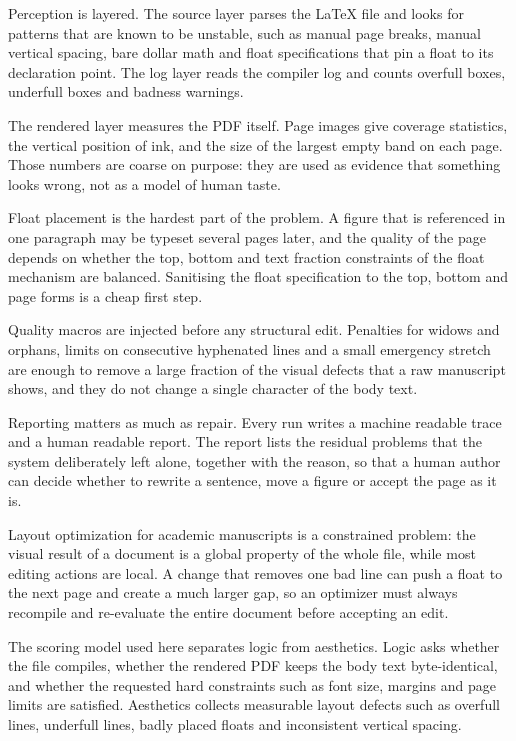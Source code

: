 \documentclass[10pt,a4paper]{article}
\begin{document}
Perception is layered. The source layer parses the LaTeX file and looks for patterns that are known to be unstable, such as manual page breaks, manual vertical spacing, bare dollar math and float specifications that pin a float to its declaration point. The log layer reads the compiler log and counts overfull boxes, underfull boxes and badness warnings.

The rendered layer measures the PDF itself. Page images give coverage statistics, the vertical position of ink, and the size of the largest empty band on each page. Those numbers are coarse on purpose: they are used as evidence that something looks wrong, not as a model of human taste.

Float placement is the hardest part of the problem. A figure that is referenced in one paragraph may be typeset several pages later, and the quality of the page depends on whether the top, bottom and text fraction constraints of the float mechanism are balanced. Sanitising the float specification to the top, bottom and page forms is a cheap first step.

Quality macros are injected before any structural edit. Penalties for widows and orphans, limits on consecutive hyphenated lines and a small emergency stretch are enough to remove a large fraction of the visual defects that a raw manuscript shows, and they do not change a single character of the body text.

Reporting matters as much as repair. Every run writes a machine readable trace and a human readable report. The report lists the residual problems that the system deliberately left alone, together with the reason, so that a human author can decide whether to rewrite a sentence, move a figure or accept the page as it is.

Layout optimization for academic manuscripts is a constrained problem: the visual result of a document is a global property of the whole file, while most editing actions are local. A change that removes one bad line can push a float to the next page and create a much larger gap, so an optimizer must always recompile and re-evaluate the entire document before accepting an edit.

The scoring model used here separates logic from aesthetics. Logic asks whether the file compiles, whether the rendered PDF keeps the body text byte-identical, and whether the requested hard constraints such as font size, margins and page limits are satisfied. Aesthetics collects measurable layout defects such as overfull lines, underfull lines, badly placed floats and inconsistent vertical spacing.
\end{document}
